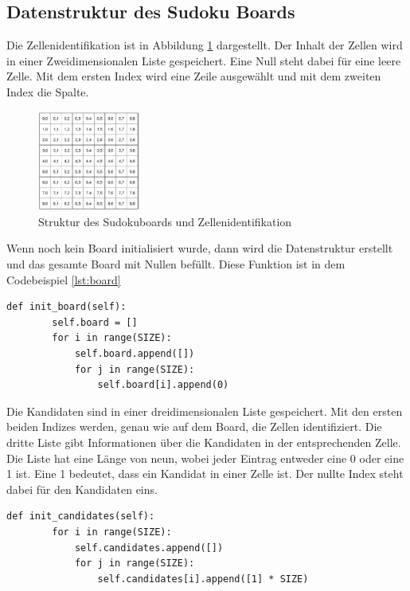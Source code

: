 \subsection{Datenstruktur des Sudoku Boards}
Die Zellenidentifikation ist in Abbildung \ref{fig:Sudokugitter} dargestellt. Der Inhalt der Zellen wird in einer Zweidimensionalen Liste gespeichert. Eine Null steht dabei für eine leere Zelle. Mit dem ersten Index wird eine Zeile ausgewählt und mit dem zweiten Index die Spalte.

\begin{figure}[htbp]
	\centering
	\includegraphics[width=0.3\textwidth]{images/board.png}
	\caption{Struktur des Sudokuboards und Zellenidentifikation \cite{zambon2015sudoku}}
	\label{fig:Sudokugitter}
\end{figure}

Wenn noch kein Board initialisiert wurde, dann wird die Datenstruktur erstellt und das gesamte Board mit Nullen befüllt. Diese Funktion ist in dem Codebeispiel \ref{lst:board} 

\begin{lstlisting}[caption={Initalisierung des Boards}, label={lst:board}]
	def init_board(self):
		self.board = []
		for i in range(SIZE):
			self.board.append([])
			for j in range(SIZE):
				self.board[i].append(0)
\end{lstlisting}

Die Kandidaten sind in einer dreidimensionalen Liste gespeichert. Mit den ersten beiden Indizes werden, genau wie auf dem Board, die Zellen identifiziert. Die dritte Liste gibt Informationen über die Kandidaten in der entsprechenden Zelle. Die Liste hat eine Länge von neun, wobei jeder Eintrag entweder eine 0 oder eine 1 ist. Eine 1 bedeutet, dass ein Kandidat in einer Zelle ist. Der nullte Index steht dabei für den Kandidaten eins.

\newpage

\begin{lstlisting}[caption={Initalisierung der Kandidaten}, label={lst:candidates}]
	def init_candidates(self):
		for i in range(SIZE):
			self.candidates.append([])
			for j in range(SIZE):
				self.candidates[i].append([1] * SIZE)
\end{lstlisting}


